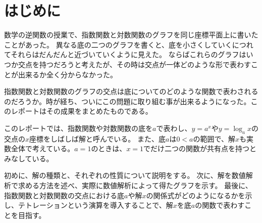 \section{はじめに}

	数学の逆関数の授業で、指数関数と対数関数のグラフを同じ座標平面上に書いたことがあった。
	異なる底の二つのグラフを書くと、底を小さくしていくにつれてそれらはだんだんと近づいていくように見えた。
	ならばこれらのグラフはいつか交点を持つだろうと考えたが、その時は交点が一体どのような形で表わすことが出来るか全く分からなかった。
	
	指数関数と対数関数のグラフの交点は底についてのどのような関数で表わされるのだろうか。時が経ち、ついにこの問題に取り組む事が出来るようになった。このレポートはその成果をまとめたものである。

	このレポートでは、指数関数や対数関数の底を$a$で表わし、$y=a^x$や$y=\log_a x$の交点の$x$座標をしばしば解と呼んでいる。
	また、底$a$は$0 < a$の範囲で、解$x$も実数全体で考えている。$a=1$のときは、$x=1$でだけ二つの関数が共有点を持つとみなしている。
	
	初めに、解の種類と、それぞれの性質について説明をする。
	次に、解を数値解析で求める方法を述べ、実際に数値解析によって得たグラフを示す。
	最後に、指数関数と対数関数の交点における底$a$や解$x$の関係式がどのようになるかを示し、テトレーションという演算を導入することで、解$x$を底$a$の関数で表わすことを目指す。
	